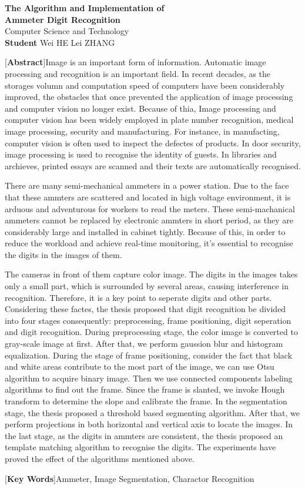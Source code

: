 \begin{center}
\vspace*{12pt}
{\bf{}The Algorithm and Implementation of \\[10pt]Ammeter Digit Recognition}\\[18pt]
Computer Science and Technology\\[12pt]
{\bf Student} \quad Wei HE  \quad Lei ZHANG\\[24pt]
\end{center}\par

{[{\bf Abstract}]Image is an important form of information. Automatic image processing and recognition is an important field. In recent decades, as the storages volumn and computation speed of computers have been considerably improved, the obstacles that once prevented the application of image processing and computer vision no longer exist. Because of thia, Image processing and computer vision has been widely employed in plate number recognition, medical image processing, security and manufacturing. For instance, in manufacting, computer vision is often used to inspect the defectes of products. In door security, image processing is used to recognise the identity of guests. In libraries and archieves, printed essays are scanned and their texts are automatically recognised.

There are many semi-mechanical ammeters in a power station. Due to the face that these ammters are scattered and located in high voltage environment, it is arduous and adventurous for workers to read the meters. These semi-machanical ammeters cannot be replaced by electronic ammters in short period, as they are considerably large and installed in cabinet tightly. Because of this, in order to reduce the workload and achieve real-time monitoring, it's essential to recognise the digits in the images of them.

The cameras in front of them capture color image. The digits in the images takes only a small part, which is surrounded by several areas, causing interference in recognition. Therefore, it is a key point to seperate digits and other parts. Considering these factes, the thesis proposed that digit recognition be divided into four stages consequently: preprocessing, frame positioning, digit seperation and digit recognition. During preprocessing stage, the color image is converted to gray-scale image at first. After that, we perform gaussion blur and histogram equalization. During the stage of frame positioning, consider the fact that black and white areas contribute to the most part of the image, we can use Otsu algorithm to acquire binary image. Then we use connected components labeling algorithms to find out the frame. Since the frame is slanted, we invoke Hough transform to determine the slope and calibrate the frame. In the segmentation stage, the thesis proposed a threshold based segmenting algorithm. After that, we perform projections in both horizontal and vertical axis to locate the images. In the last stage, as the digits in ammters are consistent, the thesis proposed an template matching algorithm to recognise the digits. The experiments have proved the effect of the algorithms mentioned above.
}

\vspace{10pt}

[{\bf Key Words}]{Ammeter, Image Segmentation, Charactor Recognition}


